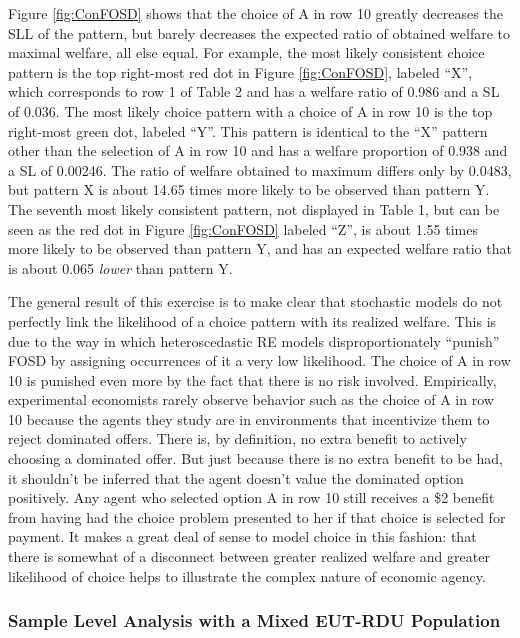 \documentclass[../main.tex]{subfiles}
\begin{document}
Figure \ref{fig:ConFOSD} shows that the choice of A in row 10 greatly decreases the SLL of the pattern, but barely decreases the expected ratio of obtained welfare to maximal welfare, all else equal.
For example, the most likely consistent choice pattern is the top right-most red dot in Figure \ref{fig:ConFOSD}, labeled \enquote{X}, which corresponds to row 1 of Table 2 and has a welfare ratio of 0.986 and a SL of 0.036.
The most likely choice pattern with a choice of A in row 10 is the top right-most green dot, labeled \enquote{Y}.
This pattern is identical to the \enquote{X} pattern other than the selection of A in row 10 and has a welfare proportion of 0.938 and a SL of 0.00246.
The ratio of welfare obtained to maximum differs only by 0.0483, but pattern X is about 14.65 times more likely to be observed than pattern Y.
The seventh most likely consistent pattern, not displayed in Table 1, but can be seen as the red dot in Figure \ref{fig:ConFOSD} labeled \enquote{Z}, is about 1.55 times more likely to be observed than pattern Y, and has an expected welfare ratio that is about 0.065 \textit{lower} than pattern Y.

The general result of this exercise is to make clear that stochastic models do not perfectly link the likelihood of a choice pattern with its realized welfare.
This is due to the way in which heteroscedastic RE models disproportionately \enquote{punish} FOSD by assigning occurrences of it a very low likelihood.
The choice of A in row 10 is punished even more by the fact that there is no risk involved.
Empirically, experimental economists rarely observe behavior such as the choice of A in row 10 because the agents they study are in environments that incentivize them to reject dominated offers.
There is, by definition, no extra benefit to actively choosing a dominated offer.
But just because there is no extra benefit to be had, it shouldn't be inferred that the agent doesn't value the dominated option positively.
Any agent who selected option A in row 10 still receives a \$2 benefit from having had the choice problem presented to her if that choice is selected for payment.
It makes a great deal of sense to model choice in this fashion: that there is somewhat of a disconnect between greater realized welfare and greater likelihood of choice helps to illustrate the complex nature of economic agency.

\subsubsection{Sample Level Analysis with a Mixed EUT-RDU Population}
\end{document}
